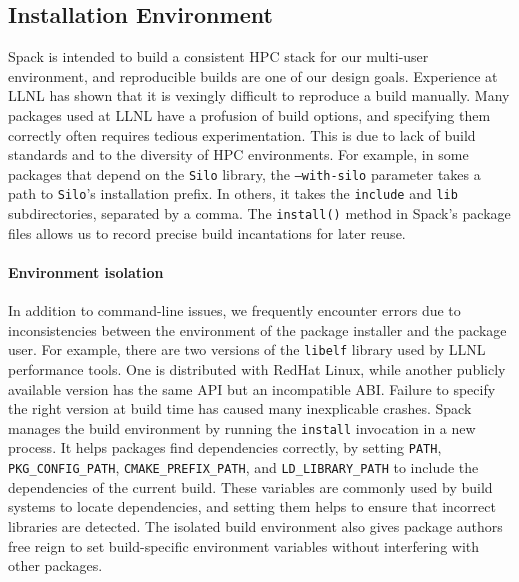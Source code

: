 

\subsection{Installation Environment}

Spack is intended to build a consistent HPC stack for our multi-user
environment, and reproducible builds are one of our design goals.
Experience at LLNL has shown that it is vexingly difficult to reproduce
a build manually.
%
Many packages used at LLNL have a profusion of build options, and specifying them 
correctly often requires tedious experimentation.  This is due to lack of
build standards and to the diversity of HPC environments.  
For example, in some packages that depend on the {\tt Silo} library,
the {\tt ---with-silo} parameter takes a path to {\tt Silo}'s installation prefix.
In others, it takes the {\tt include} and {\tt lib} subdirectories,
separated by a comma.
The {\tt install()} method in Spack's package files allows us to record
precise build incantations for later reuse.

\paragraph{Environment isolation}
In addition to command-line issues, we
frequently encounter errors due to inconsistencies between the environment of
the package installer and the package user.
%
For example, there are two versions of the {\tt libelf} library used by
LLNL performance tools. One is distributed with RedHat Linux, while another
publicly available version has the same API but an incompatible ABI.
Failure to specify the right version at build time has caused many
inexplicable crashes.
%
Spack manages the build environment by running the {\tt install} invocation
in a new process.  It helps packages find dependencies 
correctly, by setting
{\tt PATH}, {\tt PKG\_CONFIG\_PATH}, {\tt CMAKE\_PREFIX\_PATH}, and
{\tt LD\_LIBRARY\_PATH} to include the dependencies of the current build.
These variables are commonly used by build systems to locate dependencies,
and setting them helps to ensure that incorrect libraries are detected.
The isolated build environment also gives package authors 
free reign to set build-specific environment variables without interfering
with other packages.


